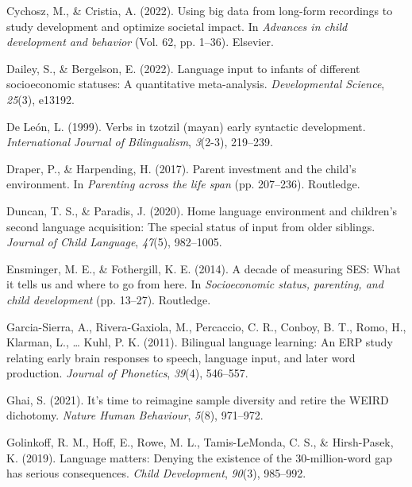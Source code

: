 \documentclass[
  man,floatsintext]{apa6}
\newlength{\cslhangindent}
\newlength{\cslentryspacingunit} %
\newenvironment{CSLReferences}[2] %
 {%
  \setlength{\parindent}{0pt}
  \ifodd #1
  \let\oldpar\par
  \def\par{\hangindent=\cslhangindent\oldpar}
  \fi
  \setlength{\parskip}{#2\cslentryspacingunit}
 }%
 {}
\begin{document}
\begin{CSLReferences}{1}{0}
\leavevmode{}%
Cychosz, M., \& Cristia, A. (2022). Using big data from long-form recordings to study development and optimize societal impact. In \emph{Advances in child development and behavior} (Vol. 62, pp. 1--36). Elsevier.

\leavevmode{}%
Dailey, S., \& Bergelson, E. (2022). Language input to infants of different socioeconomic statuses: A quantitative meta-analysis. \emph{Developmental Science}, \emph{25}(3), e13192.

\leavevmode{}%
De León, L. (1999). Verbs in tzotzil (mayan) early syntactic development. \emph{International Journal of Bilingualism}, \emph{3}(2-3), 219--239.

\leavevmode{}%
Draper, P., \& Harpending, H. (2017). Parent investment and the child's environment. In \emph{Parenting across the life span} (pp. 207--236). Routledge.

\leavevmode{}%
Duncan, T. S., \& Paradis, J. (2020). Home language environment and children's second language acquisition: The special status of input from older siblings. \emph{Journal of Child Language}, \emph{47}(5), 982--1005.

\leavevmode{}%
Ensminger, M. E., \& Fothergill, K. E. (2014). A decade of measuring SES: What it tells us and where to go from here. In \emph{Socioeconomic status, parenting, and child development} (pp. 13--27). Routledge.

\leavevmode{}%
Garcia-Sierra, A., Rivera-Gaxiola, M., Percaccio, C. R., Conboy, B. T., Romo, H., Klarman, L., \ldots{} Kuhl, P. K. (2011). Bilingual language learning: An ERP study relating early brain responses to speech, language input, and later word production. \emph{Journal of Phonetics}, \emph{39}(4), 546--557.

\leavevmode{}%
Ghai, S. (2021). It's time to reimagine sample diversity and retire the WEIRD dichotomy. \emph{Nature Human Behaviour}, \emph{5}(8), 971--972.

\leavevmode{}%
Golinkoff, R. M., Hoff, E., Rowe, M. L., Tamis-LeMonda, C. S., \& Hirsh-Pasek, K. (2019). Language matters: Denying the existence of the 30-million-word gap has serious consequences. \emph{Child Development}, \emph{90}(3), 985--992.


\end{CSLReferences}
\end{document}

